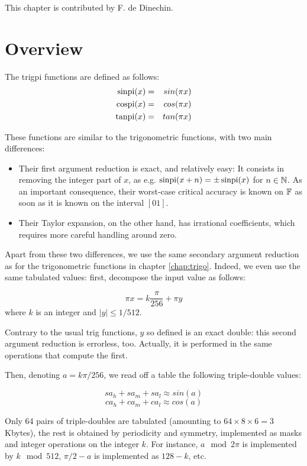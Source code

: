 This chapter is contributed by F. de Dinechin.


\section{Overview}
The trigpi functions are defined as follows:
\begin{eqnarray}
 \operatorname{sinpi}(x) &=& sin(\pi x) \\
 \operatorname{cospi}(x) &=& cos(\pi x) \\
 \operatorname{tanpi}(x) &=& tan(\pi x)
\end{eqnarray}

These functions are similar to the trigonometric functions, with
two main differences:
\begin{itemize}
\item Their first argument reduction is exact, and relatively easy: It
  consists in removing the integer part of $x$, as e.g.
  $\operatorname{sinpi}(x+n)=\pm \operatorname{sinpi}(x)$ for $n\in\mathbb {N}$. As an important consequence, their
  worst-case critical accuracy is known on $\mathbb {F}$ as soon as it is known
  on  the interval $[0 1]$.
\item Their Taylor expansion, on the other hand, has irrational
  coefficients, which requires more careful handling around zero.
\end{itemize}

Apart from these two differences, we use the same secondary argument
reduction as for the trigonometric functions in chapter
\ref{chap:trigo}. Indeed, we even use the same tabulated values:
first, decompose the input value as follows:

\begin{equation}
  \pi x = k\frac{\pi}{256} + \pi y\label{eq:trigpiargred}
\end{equation}
where  $k$  is an integer and  $ |y| \leq {1}/{512}$.

Contrary to the usual trig functions, $y$ so defined is an exact
double: this second argument reduction is errorless, too. Actually, it
is performed in the same operations that compute the first.

Then, denoting $a=k\pi/256$,
we read off a table the following triple-double values:

$$sa_h+sa_m+sa_l \approx sin(a)$$
$$ca_h+ca_m+ca_l \approx cos(a)$$

Only 64 pairs of triple-doubles  are tabulated (amounting to
$64\times 8 \times 6 = 3$ Kbytes), the rest is obtained by
periodicity and symmetry, implemented as masks and integer operations
on the integer $k$. For instance,  $a\mod 2\pi$ is implemented by $k\mod 512$,
$\pi/2-a$ is implemented as $128-k$, etc.


